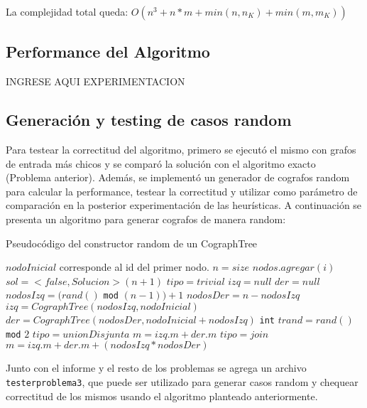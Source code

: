 La complejidad total queda: 
$O( n^3 + n*m + min( n, n_K) + min (m, m_K) )$

\subsection{Performance del Algoritmo}

INGRESE AQUI EXPERIMENTACION

\subsection{Generación y testing de casos random}

Para testear la correctitud del algoritmo, primero se ejecutó el mismo con grafos de entrada más chicos y se comparó la solución con el algoritmo exacto (Problema anterior). Además, se implementó un generador de cografos random para calcular la performance, testear la correctitud y utilizar como parámetro de comparación en la posterior experimentación de las heurísticas.
A continuación se presenta un algoritmo para generar cografos de manera random:

\begin{algorithm}[H]
  \begin{algorithmic}[1]
  \caption{Pseudocódigo del constructor random de un CographTree}
  \label{algo:3-3}
	\State \Comment $nodoInicial$ corresponde al id del primer nodo.
	\State $n = size$
		\State $nodos.agregar(i)$ 
	\EndFor
	\State $sol = <false, Solucion>(n+1)$
		\State $tipo = trivial$
		\State $izq = null$
		\State $der = null$
	\Else
		\State $nodosIzq = (rand()$ \texttt{mod} $(n-1)) + 1 $
		\State $nodosDer = n - nodosIzq$
		\State $izq = CographTree(nodosIzq, nodoInicial)$
		\State $der = CographTree(nodosDer, nodoInicial + nodosIzq)$
		\State \texttt{int} $trand = rand()$ \texttt{mod} $2$
			\State $tipo = unionDisjunta$
			\State $m = izq.m + der.m$
		\Else
			\State $tipo = join$
			\State $m = izq.m + der.m + (nodosIzq * nodosDer)$
		\EndIf
	\EndIf		
  \EndProcedure
  \end{algorithmic}
\end{algorithm}

Junto con el informe y el resto de los problemas se agrega un archivo \texttt{testerproblema3}, que puede ser utilizado para generar casos random y chequear correctitud de los mismos usando el algoritmo planteado anteriormente.


